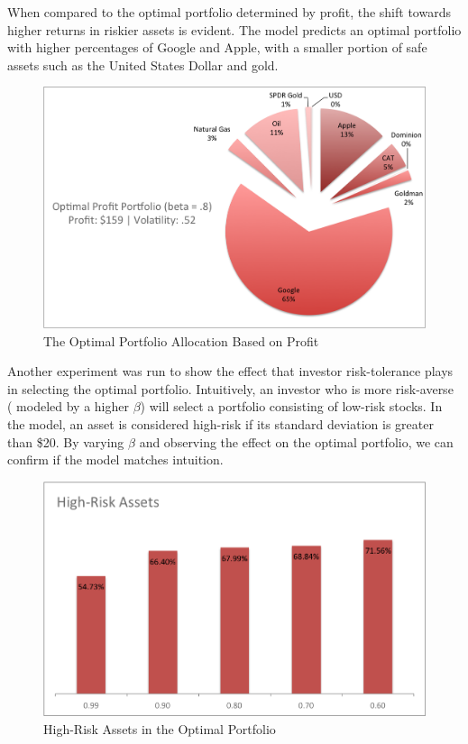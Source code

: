 \documentclass[12pt]{article}
\begin{document}
{When compared to the optimal portfolio determined by profit, the shift towards higher returns in riskier assets is evident. The model predicts an optimal portfolio with higher percentages of Google and Apple, with a smaller portion of safe assets such as the United States Dollar and gold.

\begin{figure}[H]
\begin{center}
\includegraphics[scale=.75]{Figures/OptimalPort_profit.png}
\caption{The Optimal Portfolio Allocation Based on Profit}
\end{center}
\end{figure}


\*Another experiment was run to show the effect that investor risk-tolerance plays in selecting the optimal portfolio. Intuitively, an investor who is more risk-averse ({ modeled by a higher $\beta$}) will select a portfolio consisting of low-risk stocks. In the model, an asset is considered high-risk if its standard deviation is greater than \$20. By varying $\beta$ and observing the effect on the optimal portfolio, we can confirm if the model matches intuition. 

\begin{figure}[H]
\begin{center}
\includegraphics[scale=1]{Figures/High_Risk.png}
\caption{High-Risk Assets in the Optimal Portfolio}
\end{center}
\end{figure}


}
\end{document}
